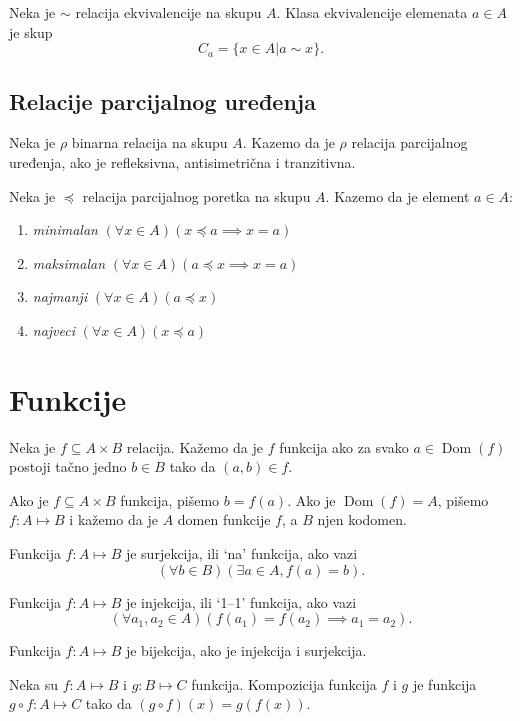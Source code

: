 \documentclass[12p,14paper]{article}
\DeclareMathOperator{\Dom}{Dom}
\begin{document}
\begin{multicols}{2}
    Neka je $\sim$ relacija ekvivalencije na skupu $A$. Klasa ekvivalencije 
    elemenata $a \in A$ je skup
    \[C_a = \{x \in A | a \sim x\}.\]

\subsection{Relacije parcijalnog uređenja}

    Neka je $\rho$ binarna relacija na skupu $A$. Kazemo da je $\rho$ relacija
    parcijalnog uređenja, ako je refleksivna, antisimetrična i tranzitivna.

    Neka je $\preceq$ relacija parcijalnog poretka na skupu $A$. Kazemo da je 
    element $a \in A$:
    \begin{enumerate}[]
        \itemsep0em
        \item \textit{minimalan} 
            $(\forall x \in A)(x \preceq a \implies x = a)$
        \item \textit{maksimalan} 
            $(\forall x \in A)(a \preceq x \implies x = a)$ 
        \item \textit{najmanji} 
            $(\forall x \in A)(a \preceq x)$
        \item \textit{najveci} 
            $(\forall x \in A)(x \preceq a)$
    \end{enumerate}

\section{Funkcije}

    Neka je $f \subseteq A \times B$ relacija. Kažemo da je $f$ funkcija ako 
    za svako $a \in \Dom (f)$ postoji tačno jedno $b \in B$ tako da 
    $(a,b) \in f$.

    Ako je $f \subseteq A \times B$ funkcija, pišemo $b = f(a)$. Ako je 
    $\Dom (f) = A$, pišemo $f: A \mapsto B$ i kažemo da je $A$ domen 
    funkcije $f$, a $B$ njen kodomen.

    Funkcija $f : A \mapsto B$ je surjekcija, ili `na' funkcija, ako vazi
    \[(\forall b \in B)(\exists a \in A, f(a) = b).\]

    Funkcija $f : A \mapsto B$ je injekcija, ili `1--1' funkcija, ako vazi
    \[(\forall a_1, a_2 \in A)(f(a_1) = f(a_2) \implies a_1 = a_2).\]

    Funkcija $f : A \mapsto B$ je bijekcija, ako je injekcija i surjekcija.

    Neka su $f: A \mapsto B$ i $g : B \mapsto C$ funkcija. Kompozicija funkcija
    $f$ i $g$ je funkcija $g \circ f : A \mapsto C$ tako da 
    $(g \circ f) (x) = g(f(x))$.


\end{multicols}
\end{document}

